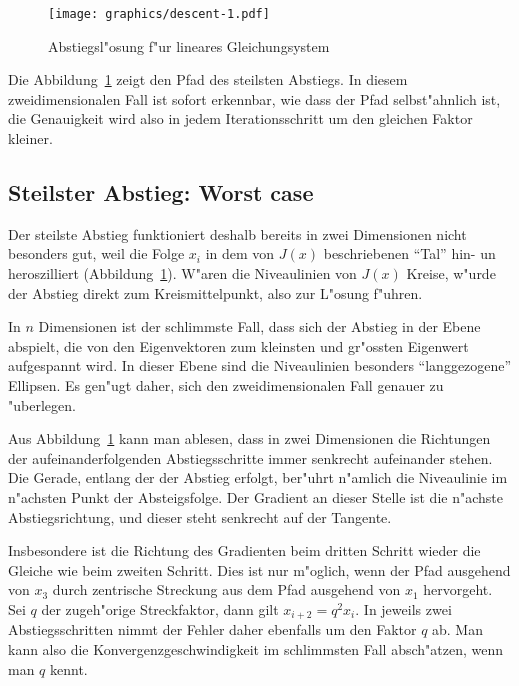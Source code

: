 \begin{figure}
\begin{center}
\texttt{[image: graphics/descent-1.pdf]}
\end{center}
\caption{Abstiegsl"osung f"ur lineares Gleichungsystem
\label{descent:path}}
\end{figure}

Die Abbildung~\ref{descent:path} zeigt den Pfad des steilsten Abstiegs.
In diesem zweidimensionalen Fall ist sofort erkennbar, wie dass der
Pfad selbst"ahnlich ist, die Genauigkeit wird also in jedem Iterationsschritt
um den gleichen Faktor kleiner.

\subsection{Steilster Abstieg: Worst case}
Der steilste Abstieg funktioniert deshalb bereits in zwei Dimensionen
nicht besonders gut, weil die Folge $x_i$ in dem von $J(x)$ beschriebenen
``Tal'' hin- un heroszilliert (Abbildung~\ref{descent:path}).
W"aren die Niveaulinien von $J(x)$ Kreise, w"urde der Abstieg direkt
zum Kreismittelpunkt, also zur L"osung f"uhren.

In $n$ Dimensionen ist der schlimmste Fall, dass sich der Abstieg in
der Ebene abspielt, die von den Eigenvektoren zum kleinsten und gr"ossten
Eigenwert aufgespannt wird.
In dieser Ebene sind die Niveaulinien besonders ``langgezogene'' 
Ellipsen.
Es gen"ugt daher, sich den zweidimensionalen Fall genauer zu "uberlegen.

Aus Abbildung~\ref{descent:path} kann man ablesen,
dass in zwei Dimensionen die Richtungen der aufeinanderfolgenden 
Abstiegsschritte immer senkrecht aufeinander stehen.
Die Gerade, entlang der der Abstieg erfolgt, ber"uhrt n"amlich die
Niveaulinie im n"achsten Punkt der Absteigsfolge. 
Der Gradient an dieser Stelle ist die n"achste Abstiegsrichtung, und
dieser steht senkrecht auf der Tangente.

Insbesondere ist die Richtung des Gradienten beim dritten Schritt wieder
die Gleiche wie beim zweiten Schritt.
Dies ist nur m"oglich, wenn der Pfad ausgehend von $x_3$ durch
zentrische Streckung aus dem Pfad ausgehend von $x_1$ hervorgeht.
Sei $q$ der zugeh"orige Streckfaktor, dann gilt $x_{i+2}=q^2x_i$.
In jeweils zwei Abstiegsschritten nimmt der Fehler daher ebenfalls um
den Faktor $q$ ab. Man kann also die Konvergenzgeschwindigkeit im
schlimmsten Fall absch"atzen, wenn man $q$ kennt.

